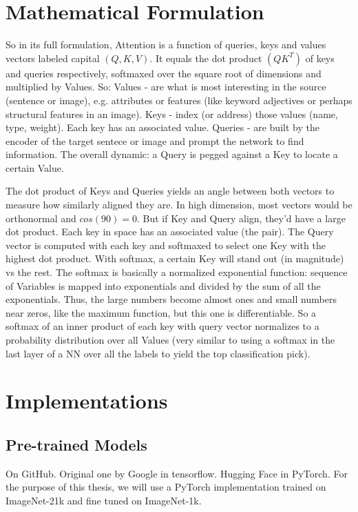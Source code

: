 \section{Mathematical Formulation}

So in its full formulation, Attention is a function of queries, keys and values 
vectors labeled capital $(Q,K,V)$. 
It equals the dot product $(QK^T)$ of keys and queries respectively, softmaxed over 
the square root of dimensions and multiplied by Values.
So:
Values - are what is most interesting in the source (sentence or image), 
e.g. attributes or features (like keyword adjectives or perhaps structural 
features in an image).
Keys - index (or address) those values (name, type, weight). Each key has an 
associated value. Queries - are built by the encoder of the target sentece or 
image and prompt the network to find information. 
The overall dynamic: a Query is pegged against a Key to locate a certain Value.	

The dot product of Keys and Queries yields an angle between both vectors to measure 
how similarly aligned they are. In high dimension, most vectors would be orthonormal 
and $cos(90)=0$. But if Key and Query align, they'd have a large dot product. 
Each key in space has an associated value (the pair). The Query vector is computed with 
each key and softmaxed to select one Key with the highest dot product. With softmax, 
a certain Key will stand out (in magnitude) vs the rest.
The softmax is basically a normalized exponential function: sequence of Variables is 
mapped into exponentials and divided by the sum of all the exponentials. Thus, the 
large numbers become almost ones and small numbers near zeros, like the maximum 
function, but this one is differentiable. 
So a softmax of an inner product of each key with query vector normalizes to a 
probability distribution over all Values (very similar to using a softmax in the last 
layer of a NN over all the labels to yield the top classification pick). 


\newpage

\section{Implementations}
\subsection{Pre-trained Models}

On GitHub.
Original one by Google in tensorflow.
Hugging Face in PyTorch.
For the purpose of this thesis, we will use a PyTorch implementation trained on ImageNet-21k
and fine tuned on ImageNet-1k.



